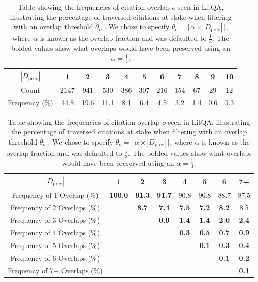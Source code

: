 \documentclass{article}
\begin{document}
\begin{table}[htb]
\caption{Various statistics on citation traversal.}
\begin{subtable}{\textwidth}
\centering
\begin{tabular}{| c || c c c c c c c c c c |}
\hline
$|D_\text{prev}|$ & 1 & 2 & 3 & 4 & 5 & 6 & 7 & 8 & 9 & 10 \\
\hline
Count & 2147 & 941 & 530 & 386 & 307 & 216 & 154 & 67 & 29 & 12 \\
\hline
Frequency (\%) & 44.8 & 19.6 & 11.1 & 8.1 & 6.4 & 4.5 & 3.2 & 1.4 & 0.6 & 0.3 \\
\hline
\end{tabular}
\caption{Distribution of traversal starting paper count $|D_\text{prev}|$.}
\label{tab:cit-trav-starting-dist}
\end{subtable}

\begin{subtable}{\textwidth}
\centering
\begin{tabular}{| c || c c c c c c c |}
\hline
$|D_\text{prev}|$ & 1 & 2 & 3 & 4 & 5 & 6 & 7+ \\
\hline
Frequency of 1 Overlap (\%) & \textbf{100.0} & \textbf{91.3} & \textbf{91.7} & 90.8 & 90.8 & 88.7 & 87.5 \\
\hline
Frequency of 2 Overlaps (\%) & \cellcolor{gray!25} & \textbf{8.7} & \textbf{7.4} & \textbf{7.5} & \textbf{7.2} & \textbf{8.2} & 8.5 \\
\hline
Frequency of 3 Overlaps (\%) & \cellcolor{gray!25} & \cellcolor{gray!25} & \textbf{0.9} & \textbf{1.4} & \textbf{1.4} & \textbf{2.0} & \textbf{2.4} \\
\hline
Frequency of 4 Overlaps (\%) & \cellcolor{gray!25} & \cellcolor{gray!25} & \cellcolor{gray!25} & \textbf{0.3} & \textbf{0.5} & \textbf{0.7} & \textbf{0.9} \\
\hline
Frequency of 5 Overlaps (\%) & \cellcolor{gray!25} & \cellcolor{gray!25} & \cellcolor{gray!25} & \cellcolor{gray!25} & \textbf{0.1} & \textbf{0.3} & \textbf{0.4} \\
\hline
Frequency of 6 Overlaps (\%) & \cellcolor{gray!25} & \cellcolor{gray!25} & \cellcolor{gray!25} & \cellcolor{gray!25} & \cellcolor{gray!25} & \textbf{0.1} & \textbf{0.2} \\
\hline
Frequency of 7+ Overlaps (\%) & \cellcolor{gray!25} & \cellcolor{gray!25} & \cellcolor{gray!25} & \cellcolor{gray!25} & \cellcolor{gray!25} & \cellcolor{gray!25} & \textbf{0.1} \\
\hline
\end{tabular}
\caption{Table showing the frequencies of citation overlap $o$ seen in LitQA, illustrating the percentage of traversed citations at stake when filtering with an overlap threshold $\theta_o$ . We chose to specify $\theta_o = \lceil \alpha \times |D_\text{prev}| \rceil$, where $\alpha$ is known as the overlap fraction and was defaulted to $\frac{1}{3}$. The bolded values show what overlaps would have been preserved using an $\alpha = \frac{1}{3}$.}
\label{tab:cit-trav-overlap-dist}
\end{subtable}
\end{table}
\end{document}
